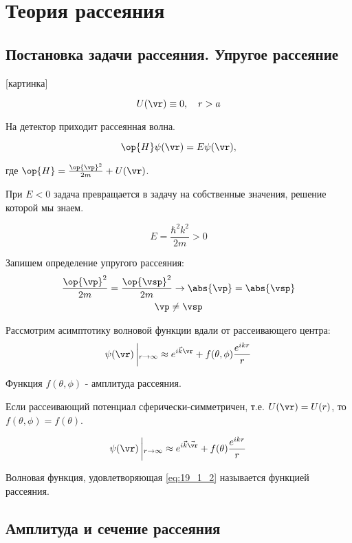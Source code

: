 \chapter{Теория рассеяния}

\section{Постановка задачи рассеяния. Упругое рассеяние}

[картинка]

$$
U(\vr) \equiv 0, ~~~ r > a
$$

На детектор приходит рассеянная волна.

\begin{equation}
\label{eq:19_1_1}
\op{H} \psi(\vr) = E \psi(\vr),
\end{equation}

где $\op{H} = \frac{\op{\vp}^2}{2m} + U(\vr)$.


При $E < 0$ задача превращается в задачу на собственные значения, решение которой мы знаем.

$$
E = \frac{\hbar^2 k^2}{2m} > 0
$$

Запишем определение упругого рассеяния:
\begin{gather*}
\frac{\op{\vp}^2}{2m} = \frac{\op{\vsp}^2}{2m} \to \abs{\vp} = \abs{\vsp} \\
\vp \not = \vsp
\end{gather*}

Рассмотрим асимптотику волновой функции вдали от рассеивающего центра:
$$
\psi(\vr) \left|_{r \to \infty} \approx e^{i \vec{k} \vr} + f(\theta, \phi) \frac{e^{ikr}}{r} \right . 
$$

Функция $f(\theta, \phi)$ - амплитуда рассеяния.

\begin{sloppypar}
Если рассеивающий потенциал сферически-симметричен, т.е. $U(\vr) = U(r)$, то $f(\theta, \phi) = f(\theta)$.
\end{sloppypar}

\begin{equation}
\label{eq:19_1_2}
\psi(\vr) \left|_{r \to \infty} \approx e^{i \vec{k} \vec{\vr}} + f(\theta) \frac{e^{ikr}}{r} \right .
\end{equation}

Волновая функция, удовлетворяющая \eqref{eq:19_1_2} называется функцией рассеяния.

\section{Амплитуда и сечение рассеяния}

